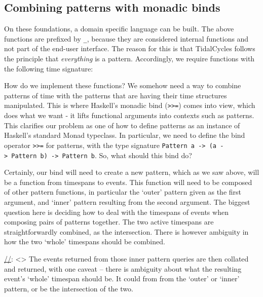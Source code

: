 \subsection{Combining patterns with monadic
binds}\label{combining-patterns-with-monadic-binds}

On these foundations, a domain specific language can be built. The above
functions are prefixed by \texttt{\_}, because they are considered
internal functions and not part of the end-user interface. The reason
for this is that TidalCycles follows the principle that
\emph{everything} is a pattern. Accordingly, we require functions with
the following time signature:

\begin{Shaded}
\begin{Highlighting}[]
   \OtherTok{{-}\textgreater{}} \OtherTok{{-}\textgreater{}} 
\end{Highlighting}
\end{Shaded}

How do we implement these functions? We somehow need a way to combine
patterns of time with the patterns that are having their time structures
manipulated. This is where Haskell's monadic bind
(\texttt{\textgreater{}\textgreater{}=}) comes into view, which does
what we want - it lifts functional arguments into contexts such as
patterns. This clarifies our problem as one of how to define patterns as
an instance of Haskell's standard Monad typeclass. In particular, we
need to define the bind operator \texttt{\textgreater{}\textgreater{}=}
for patterns, with the type signature
\texttt{Pattern\ a\ -\textgreater{}\ (a\ -\textgreater{}\ Pattern\ b)\ -\textgreater{}\ Pattern\ b}.
So, what should this bind do?

Certainly, our bind will need to create a new pattern, which as we saw
above, will be a function from timespans to events. This function will
need to be composed of other pattern functions, in particular the
`outer' pattern given as the first argument, and `inner' pattern
resulting from the second argument. The biggest question here is
deciding how to deal with the timespans of events when composing pairs
of patterns together. The two active timespans are straightforwardly
combined, as the intersection. There is however ambiguity in how the two
`whole' timespans should be combined.

\href{}{//}: \textless\textgreater{} The events returned from those
inner pattern queries are then collated and returned, with one caveat --
there is ambiguity about what the resulting event's `whole' timespan
should be. It could from from the `outer' or `inner' pattern, or be the
intersection of the two.

